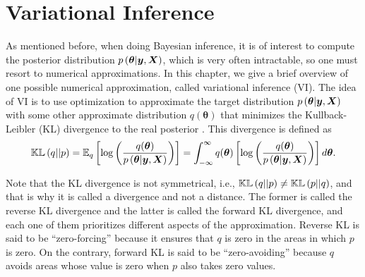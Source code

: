 
\chapter{Variational Inference}
\label{ch:variational_inference}



As mentioned before, when doing Bayesian inference, it is of interest to compute the posterior distribution $p\left( \boldsymbol{\theta} | \boldsymbol{y}, \boldsymbol{X} \right)$, which is very often intractable, so one must resort to numerical approximations. In this chapter, we give a brief overview of one possible numerical approximation, called variational inference (VI). The idea of VI is to use optimization to approximate the target distribution $p\left( \boldsymbol{\theta} | \boldsymbol{y}, \boldsymbol{X} \right)$ with some other approximate distribution $q(\boldsymbol{\theta})$ that minimizes the Kullback-Leibler (KL) divergence to the real posterior \cite{blei2017variational}. This divergence is defined as
\begin{equation}
  \label{eq:kl_divergence}
  \mathbb{KL}\left( q || p \right) = \mathbb{E}_q \left[ \log \left( \frac{q(\boldsymbol{\theta})}{p\left( \boldsymbol{\theta} | \boldsymbol{y}, \boldsymbol{X} \right)} \right) \right] = \int_{-\infty}^{\infty} q(\boldsymbol{\theta}) \left[ \log \left( \frac{q(\boldsymbol{\theta})}{p\left( \boldsymbol{\theta} | \boldsymbol{y}, \boldsymbol{X} \right)} \right) \right] d\boldsymbol{\theta}.
\end{equation}

Note that the KL divergence is not symmetrical, i.e., $\mathbb{KL}\left( q || p \right) \neq \mathbb{KL}\left( p || q \right)$, and that is why it is called a divergence and not a distance. The former is called the reverse KL divergence and the latter is called the forward KL divergence, and each one of them prioritizes different aspects of the approximation. Reverse KL is said to be ``zero-forcing'' because it ensures that $q$ is zero in the areas in which $p$ is zero. On the contrary, forward KL is said to be ``zero-avoiding'' because $q$ avoids areas whose value is zero when $p$ also takes zero values.

